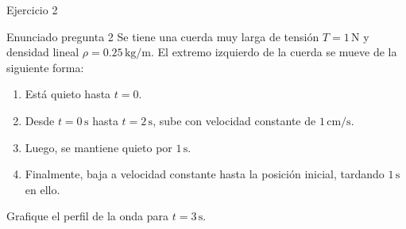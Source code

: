 \documentclass[
    10pt,
    aspectratio=169,
    xcolor={dvipsnames},
    spanish,
    ]{beamer}
\begin{document}
\begin{frame}
  
\end{frame}
\begin{frame}{Ejercicio 2}
  \begin{block}{Enunciado pregunta 2}
    Se tiene una cuerda muy larga de tensión $T=1\,\mathrm{N}$ y densidad lineal $\rho=0.25\,\mathrm{kg/m}$.
El extremo izquierdo de la cuerda se mueve de la siguiente forma:
\begin{enumerate}
  \item Está quieto hasta $t=0$.
  \item Desde $t=0\,\mathrm{s}$ hasta $t=2\,\mathrm{s}$, sube con velocidad constante de $1\,\mathrm{cm/s}$.
  \item Luego, se mantiene quieto por $1\,\mathrm{s}$.
  \item Finalmente, baja a velocidad constante hasta la posición inicial, tardando $1\,\mathrm{s}$ en ello.
\end{enumerate}
Grafique el perfil de la onda para $t=3\,\mathrm{s}$.
  \end{block}

\end{frame}
\end{document}
